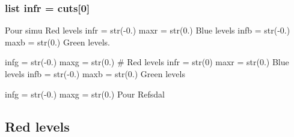 \subsubsection[{infr}]{\setlength{\rightskip}{0pt plus 5cm}list infr = cuts\mbox{[}0\mbox{]}}\label{namespace_m2_c_a_d_1_1colour__subtraction_a12bf426900d3a351c0c5800f0536aac4}


Pour simu Red levels infr = str(-\/0.) maxr = str(0.) Blue levels infb = str(-\/0.) maxb = str(0.) Green levels. 

infg = str(-\/0.) maxg = str(0.) \# Red levels infr = str(0) maxr = str(0.) Blue levels infb = str(-\/0.) maxb = str(0.) Green levels

infg = str(-\/0.) maxg = str(0.) Pour Refsdal \subsection*{Red levels}